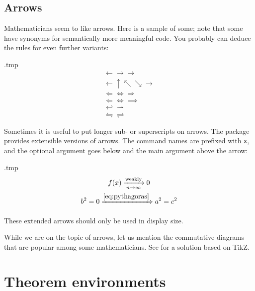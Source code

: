 \subsection{Arrows}
Mathematicians seem to like arrows.
Here is a sample of some;
note that some have synonyms for semantically more meaningful code.
You probably can deduce the rules for even further variants:
\begin{VerbatimOut}{\jobname.tmp}
\begin{gather*}
\gets \to \mapsto\\
\leftarrow \uparrow \nwarrow \searrow \rightarrow\\
\Leftarrow \Leftrightarrow \Rightarrow\\
\Longleftarrow \Longleftrightarrow \implies\\
\hookleftarrow \rightharpoonup\\
\leftrightharpoons \rightleftharpoons
\end{gather*}
\end{VerbatimOut}
\ShowExample

Sometimes it is useful to put longer sub- or superscripts on arrows.
The  package provides extensible versions of arrows.
The command names are prefixed with \verb|x|,
and the optional argument goes below and the main argument above the arrow:
%
\begin{VerbatimOut}{\jobname.tmp}
\begin{gather*}
f(x) \xrightarrow[n \to \infty]{\text{weakly}} 0\\
b^2 = 0
\xRightarrow{\eqref{eq:pythagoras}} a^2 = c^2
\end{gather*}
\end{VerbatimOut}
\ShowExample

\begin{gotcha}
These extended arrows should only be used in display size.
\end{gotcha}

While we are on the topic of arrows,
let us mention the commutative diagrams that are popular among some mathematicians.
See  for a solution based on TikZ.



%
%
%
\section{Theorem environments}\label{sec:amsthm}

